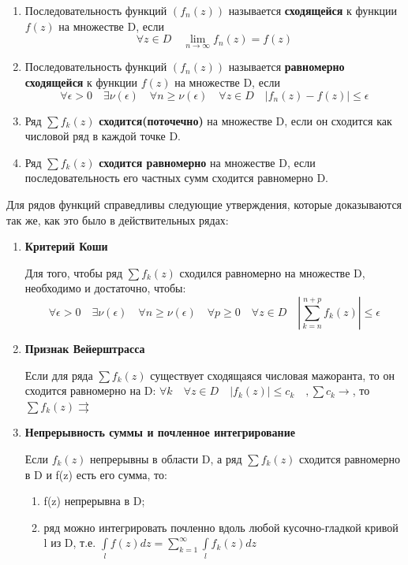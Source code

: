 \documentclass[a4paper, 12pt]{report}
\begin{document}
\begin{enumerate}
    \item Последовательность функций $(f_n(z))$ называется \textbf{сходящейся} к функции $f(z)$ на множестве D, если $$\forall z\in D\quad \lim_{n \to \infty} f_n(z)=f(z)$$
    \item Последовательность функций $(f_n(z))$ называется \textbf{равномерно сходящейся} к функции $f(z)$ на множестве D, если
    $$\forall \epsilon>0 \quad\exists \nu(\epsilon) \quad \forall n\geqslant \nu(\epsilon) \quad \forall z \in D \quad |f_n(z)-f(z)|\leqslant \epsilon$$
    \item  Ряд $\sum f_k(z) $ \textbf{сходится(поточечно)} на множестве D, если он сходится как числовой ряд в каждой точке D.
    \item Ряд $\sum f_k(z) $ \textbf{сходится равномерно} на множестве D, если последовательность его частных сумм сходится равномерно D.
\end{enumerate}

\par\bigskip
Для рядов функций справедливы следующие утверждения, которые доказываются так же, как это было в действительных рядах:
\quad\bigskip
\begin{enumerate}
    \item \textbf{Критерий Коши} \par
    Для того, чтобы ряд $\sum f_k(z) $ сходился равномерно на множестве D, необходимо и достаточно, чтобы:
    $$\forall \epsilon>0 \quad\exists \nu(\epsilon) \quad \forall n\geqslant \nu(\epsilon) \quad \forall p\geqslant 0 \quad \forall z \in D \quad \left| \sum\limits_{k=n}^{n+p} f_k(z)\right|\leqslant  \epsilon$$
    \item \textbf{Признак Вейерштрасса} \par
    Если для ряда $\sum f_k(z) $ существует сходящаяся числовая
    мажоранта, то он сходится равномерно на D:
    $\forall k \quad \forall z \in D \quad|f_k(z)|\leqslant c_k \quad ,  \sum c_k \longrightarrow$, то $\sum f_k(z) \rightrightarrows$
    
    \item \textbf{Непрерывность суммы и почленное интегрирование}\par
    Если  $ f_k(z) $ непрерывны в области D, а ряд  $\sum f_k(z) $ сходится равномерно в D и f(z) есть его сумма, то:
    \begin{enumerate}
        \item f(z) непрерывна в D;
        \item ряд можно интегрировать почленно вдоль любой кусочно-гладкой кривой l из D, т.е.
        $\int\limits_l f(z)dz= \sum\limits_{k=1}^\infty \int\limits_l f_k(z)dz$
    \end{enumerate}
\end{enumerate}
\end{document}
